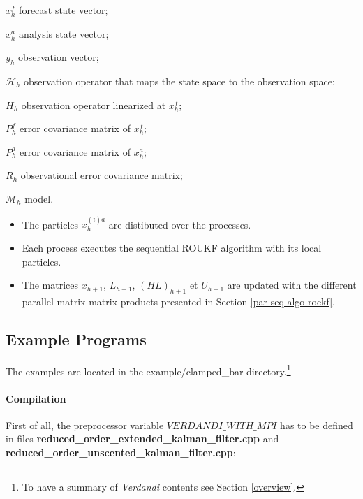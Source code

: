  $x_h^f$ forecast state vector; \par
 $x_h^a$ analysis state vector; \par
 $y_h$ observation vector; \par
 $\mathcal{H}_h$ observation operator that maps the state space to the observation space; \par
 $H_h$ observation operator linearized at $x^f_h$; \par
 $P^f_h$ error covariance matrix of $x_h^f$; \par
 $P^a_h$ error covariance matrix of $x_h^a$; \par
 $R_h$ observational error covariance matrix; \par
 $\mathcal{M}_h$ model.



 \begin{itemize}
  \item  The particles  $x_{h}^{(i)a}$ are distibuted over the processes.
  \item Each process executes the sequential ROUKF algorithm with its local particles.
  \item The matrices $x_{h+1}$, $L_{h+1}$, $(HL)_{h+1}$ et $U_{h+1}$ are updated with the different parallel matrix-matrix products presented in Section \ref{par-seq-algo-roekf}.
  \end{itemize}


\hypertarget{par-seq-example}{}\subsection{Example Programs}\label{par-seq-example}


The examples are located in the {\ttfamily example/clamped\_bar} directory.\footnote{To have a summary of \emph{Verdandi} contents see Section \ref{overview}.}


\hypertarget{par-seq-example-compilation}{}\paragraph{Compilation}\label{par-seq-example-compilation}

First of all, the preprocessor variable $ VERDANDI\_WITH\_MPI $ has to be defined in files  \textbf{reduced\_order\_extended\_kalman\_filter.cpp} and \textbf{reduced\_order\_unscented\_kalman\_filter.cpp}:


